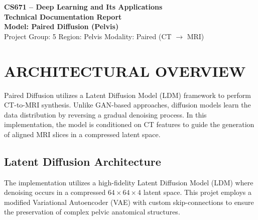 \documentclass[10pt,a4paper]{article}
\begin{document}
\begin{tcolorbox}[
  enhanced,
  colback=softbg,
  colframe=brand,
  boxrule=0.9pt,
  arc=2mm,
  left=5pt,right=5pt,top=5pt,bottom=5pt
]
\centering
{\Large\bfseries\color{brand} CS671 -- Deep Learning and Its Applications}\\[2pt]
{\large\bfseries Technical Documentation Report}\\[6pt]
{\normalsize\bfseries Model: Paired Diffusion (Pelvis)}\\[4pt]
\small
Project Group: 5 \quad Region: Pelvis \quad Modality: Paired (CT $\to$ MRI)
\end{tcolorbox}

\section{ARCHITECTURAL OVERVIEW}
Paired Diffusion utilizes a Latent Diffusion Model (LDM) framework to perform CT-to-MRI synthesis. Unlike GAN-based approaches, diffusion models learn the data distribution by reversing a gradual denoising process. In this implementation, the model is conditioned on CT features to guide the generation of aligned MRI slices in a compressed latent space.

\subsection{Latent Diffusion Architecture}
The implementation utilizes a high-fidelity Latent Diffusion Model (LDM) where denoising occurs in a compressed $64 \times 64 \times 4$ latent space. This projet employs a modified Variational Autoencoder (VAE) with custom skip-connections to ensure the preservation of complex pelvic anatomical structures.
\end{document}
